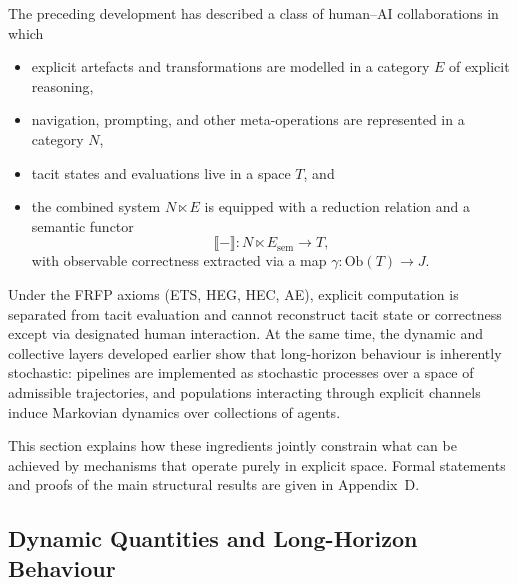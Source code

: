 \documentclass[11pt]{article}
\theoremstyle{definition}
\begin{document}
The preceding development has described a class of human--AI collaborations in which
\begin{itemize}
  \item explicit artefacts and transformations are modelled in a category $E$ of explicit reasoning,
  \item navigation, prompting, and other meta-operations are represented in a category $N$,
  \item tacit states and evaluations live in a space $T$, and
  \item the combined system $N \ltimes E$ is equipped with a reduction relation and a semantic functor
    \[
      \llbracket - \rrbracket : N \ltimes E_{\mathrm{sem}} \longrightarrow T,
    \]
    with observable correctness extracted via a map $\gamma : \mathrm{Ob}(T) \to J$.
\end{itemize}
Under the FRFP axioms (ETS, HEG, HEC, AE), explicit computation is separated from tacit evaluation and cannot reconstruct tacit state or correctness except via designated human interaction. At the same time, the dynamic and collective layers developed earlier show that long-horizon behaviour is inherently stochastic: pipelines are implemented as stochastic processes over a space of admissible trajectories, and populations interacting through explicit channels induce Markovian dynamics over collections of agents.

This section explains how these ingredients jointly constrain what can be achieved by mechanisms that operate purely in explicit space. Formal statements and proofs of the main structural results are given in Appendix~D.

\subsection{Dynamic Quantities and Long-Horizon Behaviour}
\end{document}

